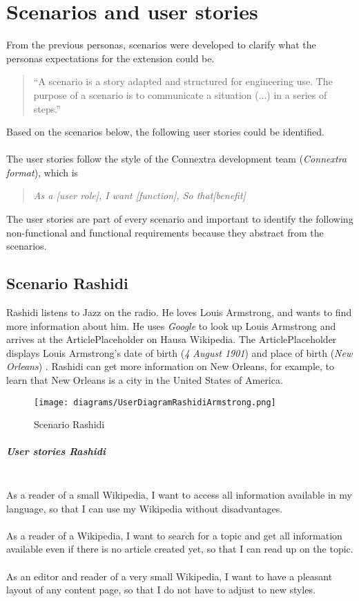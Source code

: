 \chapter{Scenarios and user stories}

From the previous personas, scenarios were developed to clarify what the personas expectations for the extension could be.
\begin{quote}
``A scenario is a story adapted and structured for engineering use. The purpose of a scenario is to communicate a situation (...) in a series of steps.'' \citep[98]{scenario} 
\end{quote}
Based on the scenarios below, the following user stories could be identified. \\
\\
The user stories follow the style of the Connextra development team (\textit{Connextra format}), which is
\begin{quote}
\textit{As a [user role], \newline I want [function], \newline So that[benefit]}
\end{quote} 
\citep{connextrastory,userstory}
The user stories are part of every scenario and important to identify the following non-functional and functional requirements because they abstract from the scenarios. 

\section{Scenario Rashidi}
Rashidi listens to Jazz on the radio. He loves Louis Armstrong, and wants to find more information about him. He uses \textit{Google} to look up Louis Armstrong and arrives at the ArticlePlaceholder on Hausa Wikipedia. The ArticlePlaceholder displays Louis Armstrong's date of birth (\textit{4 August 1901}) and place of birth (\textit{New Orleans}) \citep{wd:03}. Rashidi can get more information on New Orleans, for example, to learn that New Orleans is a city in the United States of America. 
\begin{figure}[H]
	\centering
	\texttt{[image: diagrams/UserDiagramRashidiArmstrong.png]}
	\caption{Scenario Rashidi}
	\label{fig:ScenarioRashidi}
\end{figure}

\paragraph{User stories Rashidi} ~\\
As a reader of a small Wikipedia, I want to access all information available in my language, so that I can use my Wikipedia without disadvantages. \\
\\
As a reader of a Wikipedia, I want to search for a topic and get all information available even if there is no article created yet, so that I can read up on the topic. \\
\\
As an editor and reader of a very small Wikipedia, I want to have a pleasant layout of any content page, so that I do not have to adjust to new styles.

